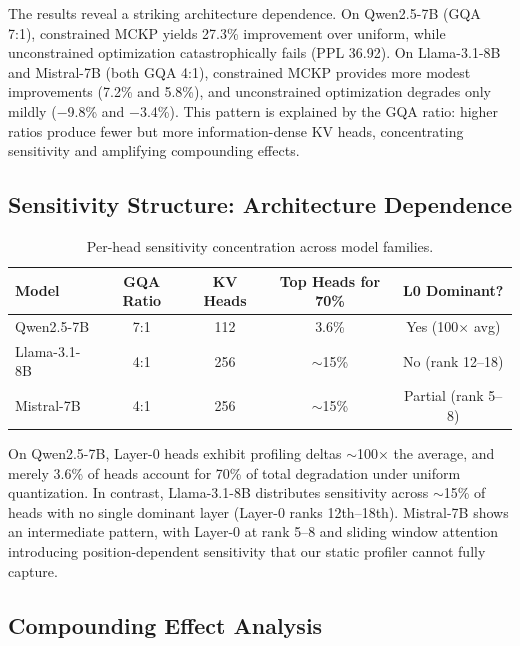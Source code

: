 \documentclass[11pt]{article}
\begin{document}
The results reveal a striking architecture dependence.
On Qwen2.5-7B (GQA 7:1), constrained MCKP yields 27.3\% improvement over uniform, while unconstrained optimization catastrophically fails (PPL 36.92).
On Llama-3.1-8B and Mistral-7B (both GQA 4:1), constrained MCKP provides more modest improvements (7.2\% and 5.8\%), and unconstrained optimization degrades only mildly ($-$9.8\% and $-$3.4\%).
This pattern is explained by the GQA ratio: higher ratios produce fewer but more information-dense KV heads, concentrating sensitivity and amplifying compounding effects.

\subsection{Sensitivity Structure: Architecture Dependence}
\label{sec:sensitivity}

\begin{table}[h]
\centering
\caption{Per-head sensitivity concentration across model families.}
\label{tab:sensitivity}
\begin{tabular}{lcccc}
\toprule
\textbf{Model} & \textbf{GQA Ratio} & \textbf{KV Heads} & \textbf{Top Heads for 70\%} & \textbf{L0 Dominant?} \\
\midrule
Qwen2.5-7B    & 7:1 & 112  & 3.6\%  & Yes (100$\times$ avg) \\
Llama-3.1-8B  & 4:1 & 256  & $\sim$15\%  & No (rank 12--18) \\
Mistral-7B    & 4:1 & 256  & $\sim$15\%  & Partial (rank 5--8) \\
\bottomrule
\end{tabular}
\end{table}

On Qwen2.5-7B, Layer-0 heads exhibit profiling deltas $\sim$100$\times$ the average, and merely 3.6\% of heads account for 70\% of total degradation under uniform quantization.
In contrast, Llama-3.1-8B distributes sensitivity across $\sim$15\% of heads with no single dominant layer (Layer-0 ranks 12th--18th).
Mistral-7B shows an intermediate pattern, with Layer-0 at rank 5--8 and sliding window attention introducing position-dependent sensitivity that our static profiler cannot fully capture.

\subsection{Compounding Effect Analysis}
\label{sec:compounding}
\end{document}
